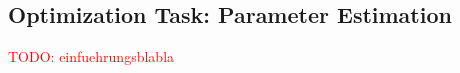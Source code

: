 \documentclass{scrartcl}[12pt, halfparskip]
\numberwithin{equation}{section}
\numberwithin{figure}{section}
\numberwithin{table}{section}
\newcommand{\todo}[1]{\textcolor{red}{TODO: #1}}
\begin{document}
%
%
%
%
%
%
%
%
%
%
%




\subsection{Optimization Task: Parameter Estimation}

\todo{einfuehrungsblabla}
\end{document}
